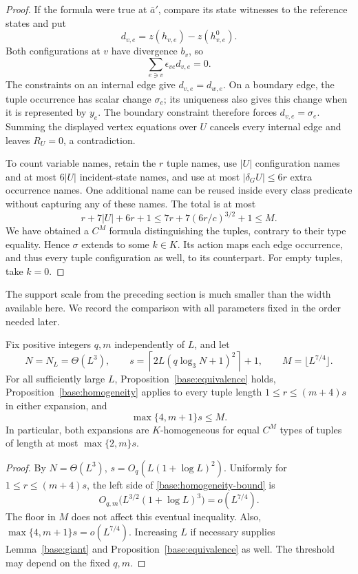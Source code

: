 \begin{proof}
If the formula were true at $\bar a'$, compare its state witnesses to
the reference states and put
\[
 d_{v,e}=z(h_{v,e})-z(h_{v,e}^0).
\]
Both configurations at $v$ have divergence $b_v$, so
\[
 \sum_{e\ni v}\epsilon_{ve}d_{v,e}=0.
\]
The constraints on an internal edge give $d_{v,e}=d_{w,e}$.  On a
boundary edge, the tuple occurrence has scalar change $\sigma_e$;
its uniqueness also gives this change when it is represented by
$y_e$.  The boundary constraint therefore forces
$d_{v,e}=\sigma_e$.  Summing the displayed vertex equations over $U$
cancels every internal edge and leaves $R_U=0$, a contradiction.

To count variable names, retain the $r$ tuple names, use $|U|$
configuration names and at most $6|U|$ incident-state names, and use
at most $|\delta_G U|\le6r$ extra occurrence names.  One additional
name can be reused inside every class predicate without capturing
any of these names.  The total is at most
\[
 r+7|U|+6r+1
 \le7r+7(6r/c)^{3/2}+1\le M.
\]
We have obtained a $C^M$ formula distinguishing the tuples, contrary
to their type equality.  Hence $\sigma$ extends to some $k\in K$.
Its action maps each edge occurrence, and thus every tuple
configuration as well, to its counterpart.  For empty tuples, take
$k=0$.
\end{proof}

The support scale from the preceding section is much smaller than the
width available here.  We record the comparison with all parameters
fixed in the order needed later.

\begin{corollary}
\label{base:width}
Fix positive integers $q,m$ independently of $L$, and let
\[
 N=N_L=\Theta(L^3),\qquad
 s=\left\lceil2L(q\log_3N+1)^2\right\rceil+1,
 \qquad M=\lfloor L^{7/4}\rfloor.
\]
For all sufficiently large $L$, Proposition~\ref{base:equivalence}
holds, Proposition~\ref{base:homogeneity} applies to every tuple length
$1\le r\le(m+4)s$ in either expansion, and
\[
 \max\{4,m+1\}s\le M.
\]
In particular, both expansions are $K$-homogeneous for equal $C^M$
types of tuples of length at most $\max\{2,m\}s$.
\end{corollary}
\begin{proof}
By $N=\Theta(L^3)$,
$s=O_q(L(1+\log L)^2)$.  Uniformly for $1\le r\le(m+4)s$, the left
side of \eqref{base:homogeneity-bound} is
\[
 O_{q,m}\bigl(L^{3/2}(1+\log L)^3\bigr)=o(L^{7/4}).
\]
The floor in $M$ does not affect this eventual inequality.  Also,
$\max\{4,m+1\}s=o(L^{7/4})$.  Increasing $L$ if necessary supplies
Lemma~\ref{base:giant} and Proposition~\ref{base:equivalence} as well.
The threshold may depend on the fixed $q,m$.
\end{proof}
